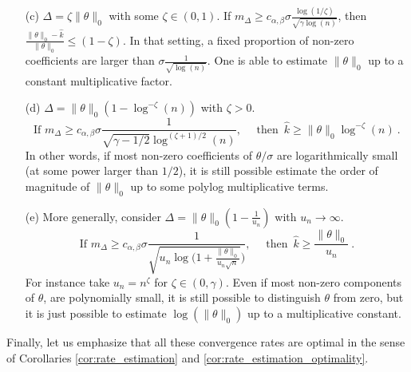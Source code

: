 \documentclass[twoside,11pt]{article}
\newcommand{\<}{\langle}
\renewcommand{\>}{\rangle}
\begin{document}
\begin{enumerate}
\begin{enumerate}
  
  \item [(c)] $\Delta= \zeta \|\theta\|_0$ with some $\zeta \in(0,1)$. If $m_\Delta\geq c_{\alpha,\beta}\sigma   \frac{\log(1/\zeta)}{\sqrt{\gamma\log(n)}}$, then $\frac{\|\theta\|_0-\widehat{k}}{\|\theta\|_0}\leq (1-\zeta)$. In that setting, a fixed proportion of non-zero coefficients are larger than $\sigma  \frac{1}{\sqrt{\log(n)}}$. One is able to estimate $\|\theta\|_0$ up to a constant multiplicative factor. 
  
  \item [(d)] $\Delta=  \|\theta\|_0(1- \log^{-\zeta}(n))$ with $\zeta>0$. 
  \[\text{If }m_{\Delta}\geq c_{\alpha,\beta}\sigma  \frac{1}{\sqrt{\gamma-1/2}\log^{(\zeta+1)/2}(n)},\quad  \text{ then }\, \widehat{k}\geq \|\theta\|_0\log^{-\zeta}(n)\ .\] In other words, if most non-zero coefficients of $\theta/\sigma$ are logarithmically small (at some power larger than $1/2$), it is still possible estimate the order of magnitude of $\|\theta\|_0$ up to some polylog multiplicative terms. 
  
  
  \item [(e)] More generally, consider $\Delta=  \|\theta\|_0(1- \tfrac{1}{u_n})$ with $u_n\to \infty$. 
  \[\text{If }m_{\Delta}\geq c_{\alpha,\beta}\sigma  \frac{1}{\sqrt{u_n\log\big(1+ \frac{\|\theta\|_0}{u_n\sqrt{n}}}\big)},\quad  \text{ then }\, \widehat{k}\geq \frac{\|\theta\|_0}{u_n}\ .\]
  For instance take $u_n=n^{\zeta}$ for $\zeta\in (0,\gamma)$. Even if most non-zero components of $\theta$, are polynomially small, it is still possible to distinguish $\theta$ from zero, but it is just possible to estimate $\log(\|\theta\|_0)$ up to a multiplicative constant.
 \end{enumerate}
\end{enumerate}
Finally, let us emphasize that all these convergence rates are optimal in the sense of Corollaries \ref{cor:rate_estimation} and \ref{cor:rate_estimation_optimality}. 



\medskip 
\end{document}
